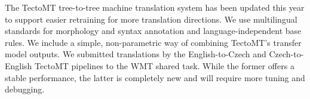 The TectoMT tree-to-tree machine translation system has been updated this year to support easier retraining for more translation directions. We use multilingual standards for morphology and syntax annotation and language-independent base rules. We include a simple, non-parametric way of combining TectoMT's transfer model outputs. We submitted translations by the English-to-Czech and Czech-to-English TectoMT pipelines to the WMT shared task. While the former offers a stable performance, the latter is completely new and will require more tuning and debugging.
